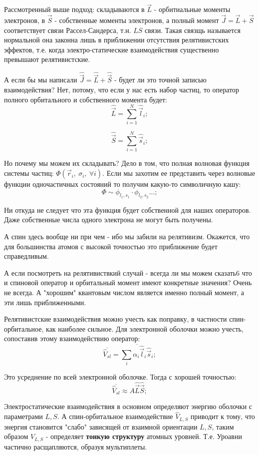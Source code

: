 \documentclass[a4paper, 14pt, russian]{article}
\newcommand{\be}{\begin{equation}}
\newcommand{\ee}{\end{equation}}
\begin{document}
	Рассмотренный выше подход: складываются в $\vec L$ - орбитиальные моменты электронов,
	в $\vec S$ - собственные моменты электронов, а полный момент $\vec J = \vec L + \vec S$
	соответствует связи Рассел-Сандерса, т.н. $LS$ связи. Такая связщь называется нормальной
	она законна лишь в приближении отсутствия релятивистских эффектов, т.е. когда 
	электро-статические взаимодействия существенно превышают релятивистские.

	А если бы мы написали $\hat{\vec J} = \hat{\vec L} + \hat{\vec S}$ - будет ли это точной
	записью взаимодействия? Нет, потому, что если у нас есть набор частиц, то оператор полного 
	орбитального и собственного момента будет:
	\be
		\hat{\vec L} = \sum_{i = 1}^{N} \hat{\vec l}_i;
	\ee

	\be
		\hat{\vec S} = \sum_{i = 1}^{N} \hat{\vec s}_i;
	\ee

	Но почему мы можем их складывать? Дело в том, что полная волновая функция системы частиц:
	$\Phi(\vec{r}_i,~\sigma_i,~\forall i)$. Если мы захотим ее представить через волновые функции 
	одночастичных состояний то получим какую-то символичную кашу:
	\be
		\Phi \sim \phi_{l_1,s_1} \cdot \phi_{l_2,s_2} \hdots;
	\ee

	Ни откуда не следует что эта функция будет собственной для наших операторов.
	Даже собственные числа одного электрона не могут быть получены.

	А спин здесь вообще ни при чем - ибо мы забили на релятивизм. Окажется, что для большинства 
	атомов с высокой точностью это приближение будет справедливым. 

	А если посмотреть на релятивиствкий случай - всегда ли мы можем сказать6 что и спиновой оператор
	и орбитальный момент имеют конкретные значения? Очень не всегда. А "хорошим" квантовым числом
	является именно полный момент, а эти лишь приближенными.

	Релятивистские взаимодействия можно учесть как поправку, в частности спин-орбитальное, как 
	наиболее сильное. Для электронной оболочки можно учесть, сопоставив этому взаимодействию оператор:
	\be
		\overline{\hat{V}_{sl}} = \overline{\sum_i \alpha_i \hat{\vec l}_i \hat{\vec s}_i};
	\ee

	Это усреднение по всей электронной оболочке. Тогда с хорошей точностью:
	\be
		\overline{\hat{V}_{sl}} \approx A \hat{\vec L} \hat{\vec S}; 
	\ee

	Электростатические взаимодействия в основном определяют энергию
	оболочки с параметрами $L,S$. А спин-орбитальное взаимодействие
	$\hat{V}_{L,S}$ приводит к тому, что энергия становится "слабо" зависящей от взаимной ориентации
	$L,S$, таким образом $V_{L,S}$ - определяет \textbf{тонкую структуру} атомных
	уровней. Т.е. Уроавни частично расщапляются, образуя мультиплеты.
\end{document}
